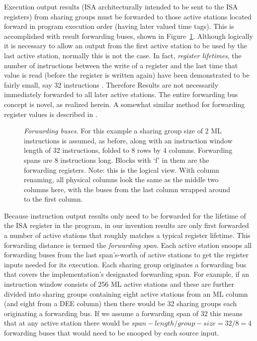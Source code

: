 \documentclass[10pt,dvips]{article}
\begin{document}
Execution output results (ISA architecturally intended to be sent to
the ISA 
registers) from sharing groups must be forwarded to those active
stations located forward in program execution order (having later
valued time tags).  This is accomplished with result forwarding
buses, shown in
Figure~\ref{forwardingbuses}.
Although logically it is necessary to allow an output from the first
active station to be used by the last active station, normally this
is not the case. In fact, {\it register lifetimes},
the number of
instructions between the write of a register and the last time that
value is read (before the register is written again)
have been demonstrated to be fairly small, say 32 instructions
\cite{Austin92}. Therefore 
Results are
not necessarily immediately forwarded to all later active stations.
The entire forwarding bus concept is novel, as realized herein. A
somewhat similar method for forwarding register values is described
in \cite{Sohi95}.

\begin{figure}
\centering
{}
\caption{{\em Forwarding buses.} For this example a
sharing group size of 2 ML
instructions is assumed, as before,
along with an instruction window length of 32 instructions, folded to
8 rows by 4 columns. Forwarding spans are 8 instructions long. Blocks with
`f' in them are the forwarding registers. Note: this is the logical view.
With column renaming, all physical columns look the same as the middle
two columns here, with the buses from the last column wrapped around to
the first column.}
\label{forwardingbuses}
\end{figure}

Because instruction output results only
need to be forwarded for the lifetime of the ISA register in the
program, in our invention
results are only first forwarded a number of active stations
that roughly matches a typical register lifetime.  This forwarding
distance is termed the {\it forwarding span}.  Each active station
snoops all forwarding buses from the last span's-worth of active
stations to get the register inputs needed for its execution.
Each sharing group originates a forwarding bus that covers the
implementation's designated forwarding span.  For example, if an
instruction window consists of 256 ML active stations and these are
further divided into sharing groups containing eight active stations
from an ML column (and eight from a DEE column) then there would be 32
sharing groups each originating a forwarding bus.  If we assume a
forwarding span of 32 this means that at
any active station there would be $span-length/group-size = 32/8 = 4$
forwarding buses that would need
to be snooped by each source input.
\end{document}
